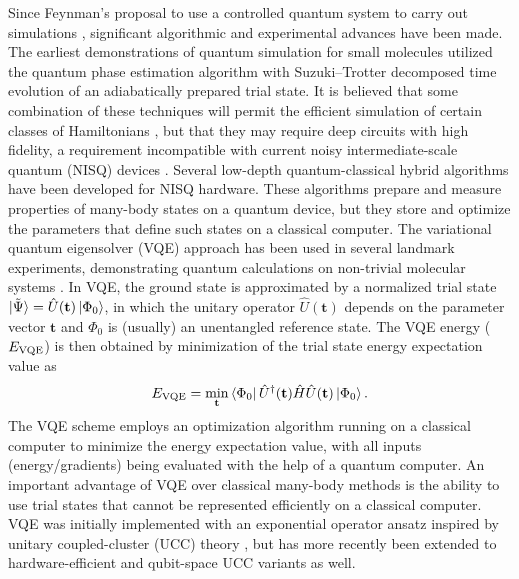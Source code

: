 \documentclass[aps,prx, reprint]{revtex4-2}
\begin{document}
Since Feynman's proposal to use a controlled quantum system to carry out simulations \cite{feynman1982simulating}, significant algorithmic and experimental advances have been made.
The earliest demonstrations of quantum simulation for small molecules \cite{aspuru2005simulated} utilized the quantum phase estimation algorithm \cite{kitaev1995quantum, Abrams:1997ha, Abrams:1999ur}  with Suzuki--Trotter decomposed time evolution \cite{trotter1959product, suzuki1993improved} of an adiabatically prepared trial state.
It is believed that some combination of these techniques will permit the efficient simulation \cite{von2020quantum, lee2020even, babbush2018low, reiher2017elucidating} of certain classes of Hamiltonians \cite{kempe2006complexity}, but that they may require deep circuits with high fidelity, a requirement incompatible with current noisy intermediate-scale quantum (NISQ) devices \cite{preskill2018quantum}.
Several low-depth quantum-classical hybrid algorithms have been developed for NISQ hardware.
These algorithms prepare and measure properties of many-body states on a quantum device, but they store and optimize the parameters that define such states on a classical computer.
The variational quantum eigensolver (VQE) approach \cite{Peruzzo:2014kca, yung2014transistor, McClean:2016bs, grimsley2019adaptive} has been used in several landmark experiments, demonstrating quantum calculations on non-trivial molecular systems \cite{OMalley:2016dc, kandala2017hardware, colless2018computation, shen2017quantum, hempel2018quantum, nam2020ground}.
In VQE, the ground state is approximated by a normalized trial state $\ket{\tilde{\Psi}} = \hat{U}(\mathbf{t}) \ket{\Phi_0}$, in which the unitary operator $\hat{U}(\mathbf{t})$ depends on the parameter vector $\mathbf{t}$ and $\Phi_0$ is (usually) an unentangled reference state.
The VQE energy ($E_{\rm{VQE}}$) is then obtained by minimization of the trial state energy expectation value as
\begin{equation}
\label{eq:vqe}
E_{\rm{VQE}} = \min_\mathbf{t} \bra{\Phi_0} \hat{U}^\dagger(\mathbf{t}) \hat{H} \hat{U}(\mathbf{t}) \ket{\Phi_0}.
\end{equation}
The VQE scheme employs an optimization algorithm running on a classical computer to minimize the energy expectation value, with all inputs (energy/gradients) being evaluated with the help of a quantum computer.
An important advantage of VQE over classical many-body methods is the ability to use trial states that cannot be represented efficiently on a classical computer.
VQE was initially implemented with an exponential operator ansatz inspired by unitary coupled-cluster (UCC) theory \cite{szalay1995alternative, taube2006new, cooper2010benchmark, evangelista2011alternative, harsha2018difference,Filip:2020ib,Chen:2021fa}, but has more recently been extended to hardware-efficient \cite{kandala2017hardware} and qubit-space \cite{Ryabinkin:2018jw} UCC variants as well.
\end{document}
